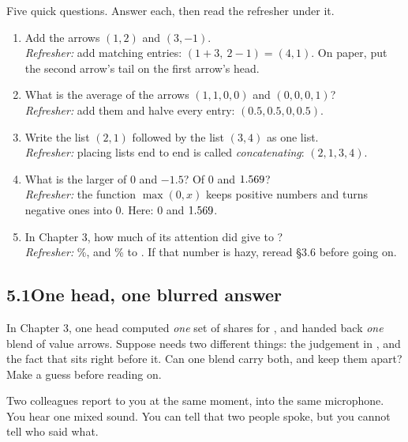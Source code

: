 \begin{beforeyoustart}
Five quick questions. Answer each, then read the refresher under it.
\begin{enumerate}[label=\arabic*.,leftmargin=1.6em]
\item Add the arrows $(1,2)$ and $(3,-1)$.\\
\emph{Refresher:} add matching entries: $(1+3,\ 2-1)=(4,1)$. On paper, put the second arrow's tail on the
first arrow's head.
\item What is the average of the arrows $(1,1,0,0)$ and $(0,0,0,1)$?\\
\emph{Refresher:} add them and halve every entry: $(0.5, 0.5, 0, 0.5)$.
\item Write the list $(2,1)$ followed by the list $(3,4)$ as one list.\\
\emph{Refresher:} placing lists end to end is called \emph{concatenating}: $(2,1,3,4)$.
\item What is the larger of $0$ and $-1.5$? Of $0$ and $1.569$?\\
\emph{Refresher:} the function $\max(0, x)$ keeps positive numbers and turns negative ones into 0. Here: $0$
and $1.569$.
\item In Chapter 3, how much of its attention did  give to ?\\
\emph{Refresher:} \nFiveChThreeWaste\%, and \nFiveChThreeOf\% to . If that number is hazy, reread \S3.6
before going on.
\end{enumerate}
\end{beforeyoustart}

\subsection*{5.1\quad One head, one blurred answer}

\Predict In Chapter 3, one head computed \emph{one} set of shares for , and handed back \emph{one}
blend of value arrows. Suppose  needs two different things: the judgement in , and the
fact that  sits right before it. Can one blend carry both, and keep them apart? Make a guess before
reading on.

\Picture Two colleagues report to you at the same moment, into the same microphone. You hear one mixed sound.
You can tell that two people spoke, but you cannot tell who said what.

